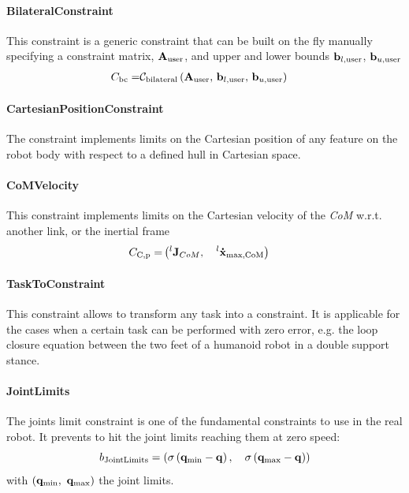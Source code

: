 \paragraph{BilateralConstraint}
This constraint is a generic constraint that can be built on the fly manually specifying a constraint matrix, $\mathbf{A}_\text{user}$, and upper and lower bounds $\mathbf{b}_{l,\text{user}}$, $\mathbf{b}_{u,\text{user}}$
\begin{eqnarray}
C_{\text{bc}} = & \mathcal{C}_\text{bilateral} \left( \mathbf{A}_\text{user},\, \mathbf{b}_{l,\text{user}} ,\, \mathbf{b}_{u,\text{user}} \right)
\end{eqnarray}

\paragraph{CartesianPositionConstraint}
The constraint implements limits on the Cartesian position of any feature on the robot body with respect to a defined hull in Cartesian space.

\paragraph{CoMVelocity}
This constraint implements limits on the Cartesian velocity of the \emph{CoM} w.r.t. another link, or the inertial frame
\begin{eqnarray}
C_\text{C,p} = & \left( ^{l}\mathbf{J}_{CoM}, \quad ^{l}\mathbf{\dot{x}}_{\text{max,CoM}} \right)
\end{eqnarray}


\paragraph{TaskToConstraint}
This constraint allows to transform any task into a constraint. It is applicable for the cases when a certain task can be performed with zero error, e.g. the loop closure equation between the two feet of a humanoid robot in a double support stance.

\paragraph{JointLimits}
The joints limit constraint is one of the fundamental constraints to use in the real robot. It prevents to hit the joint limits reaching them at zero speed: 
\begin{equation}
b_\text{JointLimits} = (\sigma\left( \mathbf{q}_\text{min} - \mathbf{q} \right),\quad \sigma\left( \mathbf{q}_\text{max} - \mathbf{q} \right))
\end{equation}
with $\left(\mathbf{q}_\text{min}, \ \mathbf{q}_\text{max} \right)$ the joint limits.


